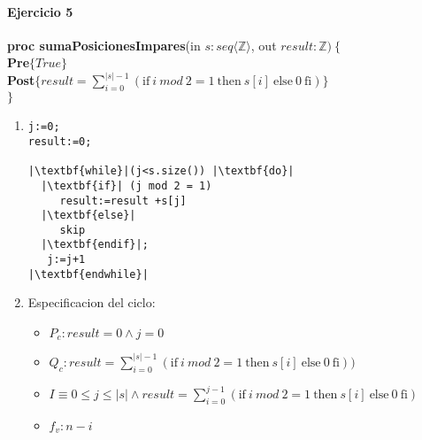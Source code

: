 \documentclass{article}
\begin{document}
\paragraph{Ejercicio 5\\}
\noindent
\textbf{proc sumaPosicionesImpares}(in $s: seq\langle\mathbb{Z}\rangle$, out $result: \mathbb{Z})\ \{$\smallskip \\
\hspace*{6mm}\textbf{Pre}$\{True \}$\\
\hspace*{6mm}\textbf{Post}$\{ result=\sum_{i=0}^{|s|-1}(\textrm{if}\ i\ mod\ 2=1\ \textrm{then}\ s[i]\ \textrm{else}\ 0\ \textrm{fi})\}$\\
$\}$\medskip\\

\noindent
\begin{enumerate}[label=\alph*)]
	\item 

\begin{lstlisting}
j:=0;
result:=0;

|\textbf{while}|(j<s.size()) |\textbf{do}|
  |\textbf{if}| (j mod 2 = 1) 
     result:=result +s[j]
  |\textbf{else}|
     skip
  |\textbf{endif}|;
   j:=j+1
|\textbf{endwhile}|
\end{lstlisting}
	\item
	
 Especificacion del ciclo:
	\begin{itemize}
		\item $P_c: result=0 \wedge j=0$
		\item $Q_c: result=\sum_{i=0}^{|s|-1}(\textrm{if}\ i\ mod\ 2=1\ \textrm{then}\ s[i]\ \textrm{else}\ 0\ \textrm{fi}))$
		\item $I\equiv 0\leq j\leq |s| \wedge result=\sum_{i=0}^{j-1}(\textrm{if}\ i\ mod\ 2=1\ \textrm{then}\ s[i]\ \textrm{else}\ 0\ \textrm{fi})$
		\item $f_v:n-i$
	\end{itemize}
	

\end{enumerate}
\end{document}
